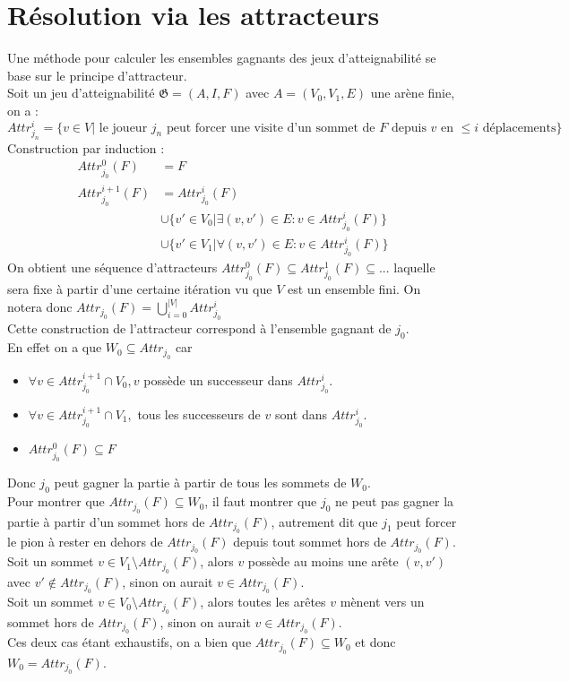 \documentclass[12pt,a4paper,oneside, titlepage]{report}
\begin{document}
\section*{Résolution via les attracteurs}
Une méthode pour calculer les ensembles gagnants des jeux d'atteignabilité se base sur le principe d'attracteur.\\ Soit un jeu d'atteignabilité $\mathfrak{G} = (A, I, F)$ avec $A=(V_0, V_1, E)$ une arène finie, on a :\\
$Attr_{j_n}^i=\{v\in V|\text{ le joueur }j_n\text{ peut forcer une visite d'un sommet de }F\text{ depuis }v\text{ en } \leq  i \text{ déplacements}\}$\\
Construction par induction :
\begin{equation}
\begin{split}
Attr^0_{j_0}(F)&=F\\
Attr^{i+1}_{j_0}(F)&=Attr^i_{j_0}(F)\\
			&\cup \{v'\in V_0|\exists(v,v')\in E:v\in Attr^i_{j_0}(F)\}\\
			&\cup \{v'\in V_1|\forall(v,v')\in E:v\in Attr^i_{j_0}(F)\}
\end{split}
\end{equation}
On obtient une séquence d'attracteurs $Attr_{j_0}^0(F)\subseteq Attr_{j_0}^1(F) \subseteq ...$ laquelle sera fixe à partir d'une certaine itération vu que $V$ est un ensemble fini. On notera donc $Attr_{j_0}(F)=\bigcup_{i=0}^{|V|}Attr_{j_0}^i$\\


Cette construction de l'attracteur correspond à l'ensemble gagnant de $j_0$.\\
En effet on a que $W_0 \subseteq Attr_{j_0}$ car
\begin{itemize}
\item $\forall v \in Attr_{j_0}^{i+1}\cap V_0, v$ possède un successeur dans $Attr_{j_0}^i$.
\item $\forall v \in Attr_{j_0}^{i+1}\cap V_1,$ tous les successeurs de $v$ sont dans $Attr_{j_0}^i$.
\item $Attr_{j_0}^0(F) \subseteq F$\\
\end{itemize}
Donc $j_0$ peut gagner la partie à partir de tous les sommets de $W_0$.\\
Pour montrer que $Attr_{j_0}(F)\subseteq W_0$, il faut montrer que $j_0$ ne peut pas gagner la partie à partir d'un sommet hors de $Attr_{j_0}(F)$, autrement dit que $j_1$ peut forcer le pion à rester en dehors de $Attr_{j_0}(F)$ depuis tout sommet hors de $Attr_{j_0}(F)$.\\
Soit un sommet $v\in V_1\setminus Attr_{j_0}(F)$, alors $v$ possède au moins une arête $(v, v')$ avec $v'\notin Attr_{j_0}(F)$, sinon on aurait $v \in Attr_{j_0}(F)$.\\
Soit  un sommet $v\in V_0\setminus Attr_{j_0}(F)$, alors toutes les arêtes $v$
mènent vers un sommet hors de $Attr_{j_0}(F)$, sinon on aurait $v \in Attr_{j_0}(F)$.\\
Ces deux cas étant exhaustifs, on a bien que $Attr_{j_0}(F)\subseteq W_0$ et donc $W_0 = Attr_{j_0}(F)$.\\
\end{document}
